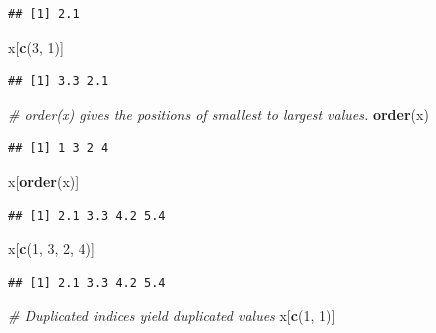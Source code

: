 \documentclass[
]{book}
\newenvironment{Shaded}{\begin{snugshade}}{\end{snugshade}}
\newcommand{\CommentTok}[1]{\textcolor[rgb]{0.56,0.35,0.01}{\textit{#1}}}
\newcommand{\DecValTok}[1]{\textcolor[rgb]{0.00,0.00,0.81}{#1}}
\newcommand{\FunctionTok}[1]{\textcolor[rgb]{0.13,0.29,0.53}{\textbf{#1}}}
\newcommand{\NormalTok}[1]{#1}
\begin{document}
\begin{verbatim}
## [1] 2.1
\end{verbatim}

\begin{Shaded}
\begin{Highlighting}[]
\NormalTok{x[}\FunctionTok{c}\NormalTok{(}\DecValTok{3}\NormalTok{, }\DecValTok{1}\NormalTok{)]}
\end{Highlighting}
\end{Shaded}

\begin{verbatim}
## [1] 3.3 2.1
\end{verbatim}

\begin{Shaded}
\begin{Highlighting}[]
\CommentTok{\# \textasciigrave{}order(x)\textasciigrave{} gives the positions of smallest to largest values.}
\FunctionTok{order}\NormalTok{(x)}
\end{Highlighting}
\end{Shaded}

\begin{verbatim}
## [1] 1 3 2 4
\end{verbatim}

\begin{Shaded}
\begin{Highlighting}[]
\NormalTok{x[}\FunctionTok{order}\NormalTok{(x)]}
\end{Highlighting}
\end{Shaded}

\begin{verbatim}
## [1] 2.1 3.3 4.2 5.4
\end{verbatim}

\begin{Shaded}
\begin{Highlighting}[]
\NormalTok{x[}\FunctionTok{c}\NormalTok{(}\DecValTok{1}\NormalTok{, }\DecValTok{3}\NormalTok{, }\DecValTok{2}\NormalTok{, }\DecValTok{4}\NormalTok{)]}
\end{Highlighting}
\end{Shaded}

\begin{verbatim}
## [1] 2.1 3.3 4.2 5.4
\end{verbatim}

\begin{Shaded}
\begin{Highlighting}[]
\CommentTok{\# Duplicated indices yield duplicated values}
\NormalTok{x[}\FunctionTok{c}\NormalTok{(}\DecValTok{1}\NormalTok{, }\DecValTok{1}\NormalTok{)]}
\end{Highlighting}
\end{Shaded}
\end{document}
